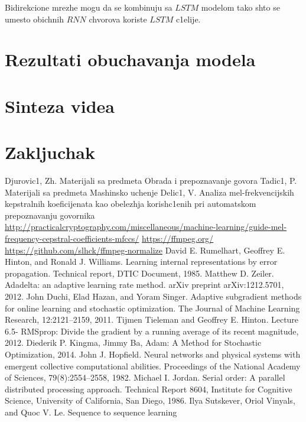 \documentclass[a4paper, openany, oneside, 11pt]{book}
\begin{document}
Bidirekcione mrezhe mogu da se kombinuju sa $LSTM$ modelom tako shto se umesto obichnih $RNN$ chvorova koriste $LSTM$ c1elije.
\chapter{Rezultati obuchavanja modela}

\chapter{Sinteza videa}
\chapter{Zakljuchak}


\begin{thebibliography}{99}
Djurovic1, Zh. Materijali sa predmeta Obrada i prepoznavanje govora
Tadic1, P. Materijali sa predmeta Mashinsko uchenje
Delic1, V. Analiza mel-frekvencijskih kepstralnih koeficijenata kao obelezhja korish\-c1enih pri automat\-skom prepoznavanju govornika
\selectfont
\url{http://practicalcryptography.com/miscellaneous/machine-learning/guide-mel-frequency-cepstral-coefficients-mfccs/}
\url{https://ffmpeg.org/}
\url{https://github.com/slhck/ffmpeg-normalize}
David E. Rumelhart, Geoffrey E. Hinton, and Ronald J. Williams. Learning
internal representations by error propagation. Technical report, DTIC Document, 1985.
Matthew D. Zeiler. Adadelta: an adaptive learning rate method. arXiv preprint arXiv:1212.5701, 2012.
John Duchi, Elad Hazan, and Yoram Singer. Adaptive subgradient methods for
online learning and stochastic optimization. The Journal of Machine Learning Research, 12:2121–2159, 2011.
Tijmen Tieleman and Geoffrey E. Hinton. Lecture 6.5- RMSprop: Divide
the gradient by a running average of its recent magnitude, 2012.
Diederik P. Kingma, Jimmy Ba, Adam: A Method for Stochastic Optimization, 2014.
John J. Hopfield. Neural networks and physical systems with emergent collective
computational abilities. Proceedings of the National Academy of Sciences, 79(8):2554–2558, 1982.
Michael I. Jordan. Serial order: A parallel distributed processing approach.
Technical Report 8604, Institute for Cognitive Science, University of California, San Diego, 1986.
Ilya Sutskever, Oriol Vinyals, and Quoc V. Le. Sequence to sequence learning

\end{thebibliography}
\end{document}
